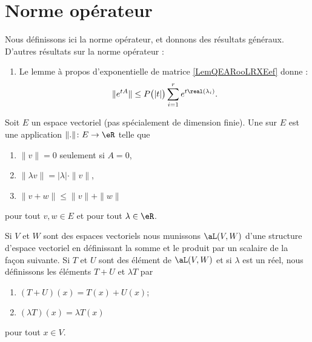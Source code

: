 \section{Norme opérateur}
\label{SeckwyQjK}

Nous définissons ici la norme opérateur, et donnons des résultats généraux. D'autres résultats sur la norme opérateur :
\begin{enumerate}
    \item
        Le lemme à propos d'exponentielle de matrice \ref{LemQEARooLRXEef} donne :
        \begin{equation}
            \|  e^{tA} \|\leq P\big( | t | \big)\sum_{i=1}^r e^{t\real(\lambda_i)}.
        \end{equation}
\end{enumerate}

\begin{definition}  \label{DefOYPooZIoWnI}
    Soit \( E\) un espace vectoriel (pas spécialement de dimension finie). Une   sur $E$ est une application $\| . \|\colon E\to \eR$ telle que
    \begin{enumerate}
        \item
            $\| v \|=0$ seulement si $A=0$,
        \item
            $\| \lambda v \|=| \lambda |\cdot\| v \|$,
        \item
            $\| v+w \|\leq\| v \|+\| w \|$

    \end{enumerate}
    pour tout $v,w\in E$ et pour tout $\lambda\in\eR$.
\end{definition}

\begin{definition}  \label{DefDQRooVGbzSm}
    Si \( V\) et \( W\) sont des espaces vectoriels nous munissons \( \aL(V,W)\) d'une structure d'espace vectoriel en définissant la somme et le produit par un scalaire de la façon suivante. Si $T$ et $U$ sont des élément de $\aL(V,W)$ et si $\lambda$ est un réel, nous définissons les éléments $T+U$ et $\lambda T$ par
    \begin{enumerate}
        \item
            $(T+U)(x)=T(x)+U(x)$;
        \item
            $(\lambda T)(x)=\lambda T(x)$
    \end{enumerate}
    pour tout \( x\in V\).
\end{definition}

